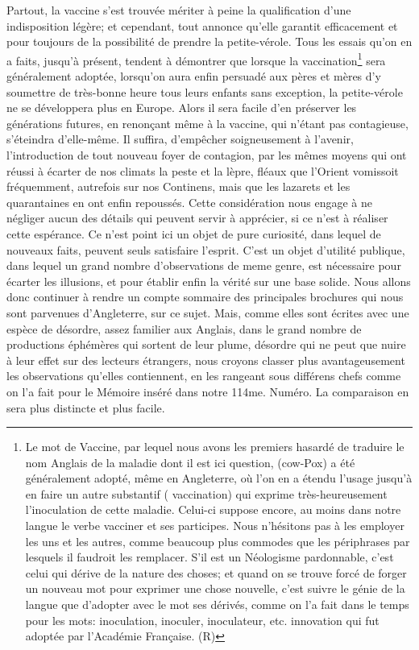 Partout, la vaccine s'est trouvée mériter à peine la qualification d'une indisposition légère; et cependant, tout annonce qu'elle garantit efficacement et pour toujours de la possibilité de prendre la petite-vérole. Tous les essais qu'on en a faits, jusqu'à présent, tendent à démontrer que lorsque la vaccination\footnote{Le mot de Vaccine, par lequel nous avons les premiers hasardé de traduire le nom Anglais de la maladie dont il est ici question, (cow-Pox) a été généralement adopté, même en Angleterre, où l'on en a étendu l'usage jusqu'à en faire un autre substantif ( vaccination) qui exprime très-heureusement l'inoculation de cette maladie. Celui-ci suppose encore, au moins dans notre langue le verbe vacciner et ses participes. Nous n'hésitons pas à les employer les uns et les autres, comme beaucoup plus commodes que les périphrases par lesquels il faudroit les remplacer. S'il est un Néologisme pardonnable, c'est celui qui dérive de la nature des choses; et quand on se trouve forcé de forger un nouveau mot pour exprimer une chose nouvelle, c'est suivre le génie de la langue que d'adopter avec le mot ses dérivés, comme on l'a fait dans le temps pour les mots: inoculation, inoculer, inoculateur, etc. innovation qui fut adoptée par l'Académie Française. (R)} sera généralement adoptée, lorsqu'on\setcounter{page}{263} aura enfin persuadé aux pères et mères d'y soumettre de très-bonne heure tous leurs enfants sans exception, la petite-vérole ne se développera plus en Europe. Alors il sera facile d'en préserver les générations futures, en renonçant même à la vaccine, qui n'étant pas contagieuse, s'éteindra d'elle-même. Il suffira, d'empêcher soigneusement à l'avenir, l'introduction de tout nouveau foyer de contagion, par les mêmes moyens qui ont réussi à écarter de nos climats la peste et la lèpre, fléaux que l'Orient vomissoit fréquemment, autrefois sur nos Continens, mais que les lazarets et les quarantaines en ont enfin repoussés.
Cette considération nous engage à ne négliger aucun des détails qui peuvent servir à apprécier, si ce n'est à réaliser cette espérance.\setcounter{page}{264} Ce n'est point ici un objet de pure curiosité, dans lequel de nouveaux faits, peuvent seuls satisfaire l'esprit. C'est un objet d'utilité publique, dans lequel un grand nombre d'observations de meme genre, est nécessaire pour écarter les illusions, et pour établir enfin la vérité sur une base solide. Nous allons donc continuer à rendre un compte sommaire des principales brochures qui nous sont parvenues d'Angleterre, sur ce sujet. Mais, comme elles sont écrites avec une espèce de désordre, assez familier aux Anglais, dans le grand nombre de productions éphémères qui sortent de leur plume, désordre qui ne peut que nuire à leur effet sur des lecteurs étrangers, nous croyons classer plus avantageusement les observations qu'elles contiennent, en les rangeant sous différens chefs comme on l'a fait pour le Mémoire inséré dans notre 114me. Numéro. La comparaison en sera plus distincte et plus facile.
